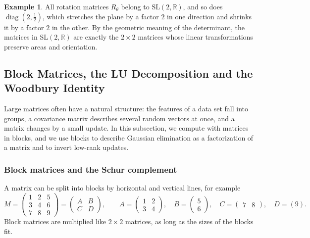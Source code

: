 \documentclass[11pt]{article}
\theoremstyle{definition}
\newtheorem{example}[definition]{Example}
\theoremstyle{plain}
\theoremstyle{remark}
\DeclareMathOperator{\diag}{diag}
\begin{document}
\begin{example}
    All rotation matrices $R_\theta$ belong to $\mathrm{SL}(2, \mathbb{R})$, and so does $\diag(2, \frac{1}{2})$, which stretches the plane by a factor $2$ in one direction and shrinks it by a factor $2$ in the other. By the geometric meaning of the determinant, the matrices in $\mathrm{SL}(2, \mathbb{R})$ are exactly the $2 \times 2$ matrices whose linear transformations preserve areas and orientation.
\end{example}

\subsection{Block Matrices, the LU Decomposition and the Woodbury Identity}\label{subsec:block}

Large matrices often have a natural structure: the features of a data set fall into groups, a covariance matrix describes several random vectors at once, and a matrix changes by a small update. In this subsection, we compute with matrices in blocks, and we use blocks to describe Gaussian elimination as a factorization of a matrix and to invert low-rank updates.

\subsubsection{Block matrices and the Schur complement}

A matrix can be split into blocks by horizontal and vertical lines, for example
\[M = \left(\begin{array}{cc|c}
    1 & 2 & 5 \\
    3 & 4 & 6 \\ \hline
    7 & 8 & 9
\end{array}\right) = \begin{pmatrix} A & B \\ C & D \end{pmatrix}, \qquad A = \begin{pmatrix} 1 & 2 \\ 3 & 4 \end{pmatrix}, \quad B = \begin{pmatrix} 5 \\ 6 \end{pmatrix}, \quad C = \begin{pmatrix} 7 & 8 \end{pmatrix}, \quad D = (9).\]
Block matrices are multiplied like $2 \times 2$ matrices, as long as the sizes of the blocks fit.
\end{document}
